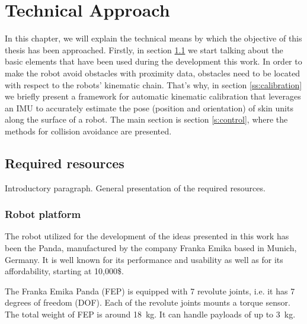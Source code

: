 \chapter{Technical Approach}
\label{ch:tec}

In this chapter, we will explain the technical means by which the objective of this thesis has been approached. Firstly, in section \ref{s:pre} we start talking about the basic elements that have been used during the development this work. In order to make the robot avoid obstacles with proximity data, obstacles need to be located with respect to the robots’ kinematic chain. That's why, in section \ref{ss:calibration} we briefly present a framework for automatic kinematic calibration that leverages an IMU to accurately estimate the pose (position and orientation) of skin units along the surface of a robot. The main section is section \ref{s:control}, where the methods for collision avoidance are presented.

\section{Required resources}
\label{s:pre}
Introductory paragraph. General presentation of the required resources.

\subsection{Robot platform}
\label{ss:panda}

The robot utilized for the development of the ideas presented in this work has been the Panda, manufactured by the company Franka Emika based in Munich, Germany. It is well known for its performance and usability as well as for its affordability, starting at 10,000\$.

The Franka Emika Panda (FEP) is equipped with 7 revolute joints, i.e. it has 7 degrees of freedom (DOF). Each of the revolute joints mounts a torque sensor. The total weight of FEP is around \SI{18}{\kilo\gram}. It can handle payloads of up to \SI{3}{\kilo\gram}.


